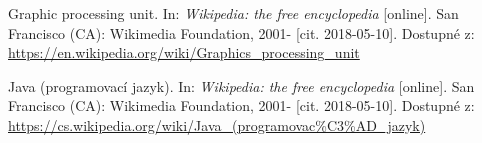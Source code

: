 \documentclass[a4paper,12pt]{article}
\begin{document}
{  Graphic processing unit. In: \textit{Wikipedia: the free encyclopedia} [online]. San Francisco (CA): Wikimedia Foundation, 2001- [cit. 2018-05-10]. Dostupné z: \url{https://en.wikipedia.org/wiki/Graphics_processing_unit}
  
  Java (programovací jazyk). In: \textit{Wikipedia: the free encyclopedia} [online]. San Francisco (CA): Wikimedia Foundation, 2001- [cit. 2018-05-10]. Dostupné z: \url{https://cs.wikipedia.org/wiki/Java_(programovac\%C3\%AD_jazyk)}
    
}





\seznamobr  %


\seznamtab  %




\end{document}
